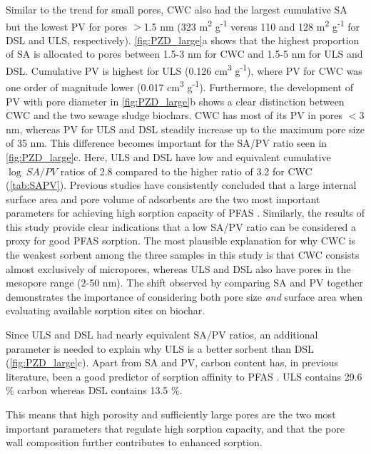 Similar to the trend for small pores, CWC also had the largest cumulative SA but the lowest PV for pores $>$1.5 nm (323 m\textsuperscript{2} g\textsuperscript{-1} versus 110 and 128 m\textsuperscript{2} g\textsuperscript{-1} for DSL and ULS, respectively). \cref{fig:PZD_large}a shows that the highest proportion of SA is allocated to pores between 1.5-3 nm for CWC and 1.5-5 nm for ULS and DSL. Cumulative PV is highest for ULS (0.126 cm\textsuperscript{3} g\textsuperscript{-1}), where PV for CWC was one order of magnitude lower (0.017 cm\textsuperscript{3} g\textsuperscript{-1}). Furthermore, the development of PV with pore diameter in \cref{fig:PZD_large}b shows a clear distinction between CWC and the two sewage sludge biochars. CWC has most of its PV in pores $<$3 nm, whereas PV for ULS and DSL steadily increase up to the maximum pore size of 35 nm. This difference becomes important for the SA/PV ratio seen in \cref{fig:PZD_large}c. Here, ULS and DSL have low and equivalent cumulative $\log~SA/PV$ ratios of 2.8 compared to the higher ratio of 3.2 for CWC (\cref{tab:SAPV}). Previous studies have consistently concluded that a large internal surface area and pore volume of adsorbents are the two most important parameters for achieving high sorption capacity of PFAS \citep{du2014adsorption,Sormo2021,Hale2016,ahmed2020per}. Similarly, the results of this study provide clear indications that a low SA/PV ratio can be considered a proxy for good PFAS sorption. The most plausible explanation for why CWC is the weakest sorbent among the three samples in this study is that CWC consists almost exclusively of micropores, whereas ULS and DSL also have pores in the mesopore range (2-50 nm). The shift observed by comparing SA and PV together demonstrates the importance of considering both pore size \textit{and} surface area when evaluating available sorption sites on biochar.

Since ULS and DSL had nearly equivalent SA/PV ratios, an additional parameter is needed to explain why ULS is a better sorbent than DSL (\cref{fig:PZD_large}c). Apart from SA and PV, carbon content has, in previous literature, been a good predictor of sorption affinity to PFAS \citep{Hale2016,Cornelissen2005}. ULS contains 29.6 \% carbon whereas DSL contains 13.5 \%.  

 This means that high porosity and sufficiently large pores are the two most important parameters that regulate high sorption capacity, and that the pore wall composition further contributes to enhanced sorption. 


